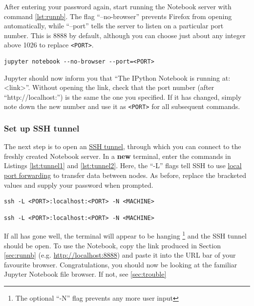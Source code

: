 \documentclass[a4paper]{article}
\begin{document}
After entering your password again, start running the Notebook server with command \ref{lst:runnb}.
The flag ``--no-browser'' prevents Firefox from opening automatically, while ``--port'' tells the server to listen on a particular port number.
This is 8888 by default, although you can choose just about any integer above 1026 to replace \texttt{\textless{}PORT\textgreater{}}.

\begin{lstlisting}[caption={Run Notebook server}, label={lst:runnb}]
jupyter notebook --no-browser --port=<PORT>
\end{lstlisting}

Jupyter should now inform you that ``The IPython Notebook is running at: \textless{}link\textgreater{}''.
Without opening the link, check that the port number (after ``http://localhost:'') is the same the one you specified.
If it has changed, simply note down the new number and use it as \texttt{\textless{}PORT\textgreater{}} for all subsequent commands.

\subsubsection{Set up SSH tunnel}
\label{sec:tunnel}
The next step is to open an \href{http://blog.trackets.com/2014/05/17/ssh-tunnel-local-and-remote-port-forwarding-explained-with-examples.html}{SSH tunnel}, through which you can connect to the freshly created Notebook server.
In a \textbf{new} terminal, enter the commands in Listings \ref{lst:tunnel1} and \ref{lst:tunnel2}.
Here, the ``-L'' flags tell SSH to use \href{https://help.ubuntu.com/community/SSH/OpenSSH/PortForwarding}{local port forwarding} to transfer data between nodes. 
As before, replace the bracketed values and supply your password when prompted.

\begin{lstlisting}[caption={Tunnel to gateway server}, label={lst:tunnel1}]
ssh -L <PORT>:localhost:<PORT> -N <MACHINE>
\end{lstlisting}

\begin{lstlisting}[caption={Tunnel to machine}, label={lst:tunnel2}]
ssh -L <PORT>:localhost:<PORT> -N <MACHINE>
\end{lstlisting}

If all has gone well, the terminal will appear to be hanging \footnote{The optional ``-N'' flag prevents any more user input} and the SSH tunnel should be open.
To use the Notebook, copy the link produced in Section \ref{sec:runnb} (e.g. \url{http://localhost:8888}) and paste it into the URL bar of your favourite browser. 
Congratulations, you should now be looking at the familiar Jupyter Notebook file browser. If not, see \ref{sec:trouble} 
\end{document}
